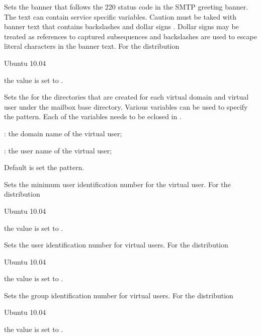 
Sets the banner  that follows the 220 status code in the SMTP 
greeting banner. The text can contain service specific variables. Caution
must be taked with banner text that contains backslashes \qcode{\textbackslash} and 
dollar signs \qcode{\$}. Dollar signs may be treated as references to 
captured subsequences and backslashes are used to escape literal characters 
in the banner text.
For the distribution
\begin{inparaitem}
\item[\TheDistribution{ubuntu}] Ubuntu 10.04
\end{inparaitem}
the value is set to .


Sets the  for the directories that are created for each virtual
domain and virtual user under the mailbox base directory. 
Various variables can be used to specify the pattern.
Each of the variables needs to be eclosed in \qcode{\$\{\}}.
\begin{compactitem}
\item[\qcode{domain}:] the domain name of the virtual user;
\item[\qcode{user}:] the user name of the virtual user;
\end{compactitem}
Default is set the  pattern.


Sets the minimum user identification number  for the virtual user.
For the distribution
\begin{inparaitem}
\item[\TheDistribution{ubuntu}] Ubuntu 10.04
\end{inparaitem}
the value is set to .


Sets the user identification number  for virtual users.
For the distribution
\begin{inparaitem}
\item[\TheDistribution{ubuntu}] Ubuntu 10.04
\end{inparaitem}
the value is set to .


Sets the group identification number  for virtual users.
For the distribution
\begin{inparaitem}
\item[\TheDistribution{ubuntu}] Ubuntu 10.04
\end{inparaitem}
the value is set to .

